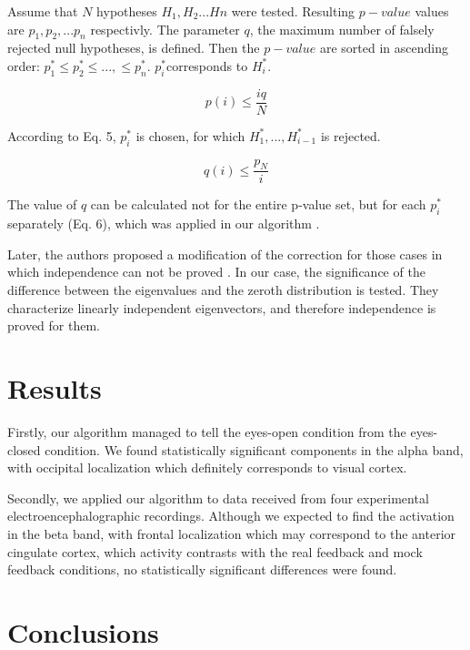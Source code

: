 \documentclass[14pt,a4paper]{scrartcl}
\begin{document}
Assume that $N$ hypotheses $H_1, H_2 ... Hn$ were tested. Resulting $p-value$ values are $p_1, p_2, ... p_n$ respectivly. The parameter $q$, the maximum number of falsely rejected null hypotheses, is defined. Then the $p-value$ are sorted in ascending order: $p^*_1 \leqslant p^*_2 \leqslant ... , \leqslant p^*_n$. $p^*_i$corresponds to $H^*_i$.

\begin{equation}
p(i) \leqslant \frac{iq}{N}
\end{equation}

According to Eq. 5, $p^*_i$ is chosen, for which $H^*_1, ... , H^*_{i-1}$ is rejected. 

\begin{equation}
q(i) \leqslant \frac{p_N}{i}
\end{equation}

The value of $q$ can be calculated not for the entire p-value set, but for each $p^*_i$ separately (Eq. 6), which was applied in our algorithm \cite{Benjamini1995}.

Later, the authors proposed a modification of the correction for those cases in which independence can not be proved \cite{Benjamini2001}. In our case, the significance of the difference between the eigenvalues and the zeroth distribution is tested. They characterize linearly independent eigenvectors, and therefore independence is proved for them. 
 

\newpage
\section{Results}
\label{sec:Results}  

Firstly, our algorithm managed to tell the eyes-open condition from the eyes-closed condition. We found statistically significant components in the alpha band, with occipital localization which definitely corresponds to visual cortex.

Secondly, we applied our algorithm to data received from four experimental electroencephalographic recordings. Although we expected to find the activation in the beta band, with frontal localization which may correspond to the anterior cingulate cortex, which activity contrasts with the real feedback and mock feedback conditions, no statistically significant differences were found.

\newpage
\section{Conclusions}
\label{sec:Conclusions} 
\end{document}

